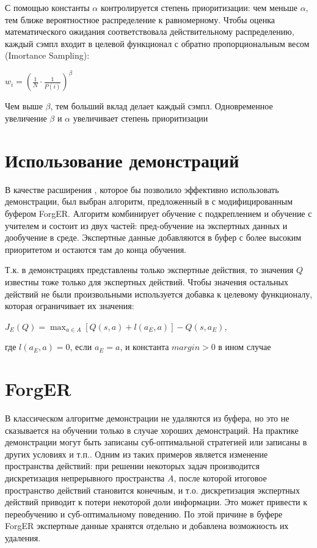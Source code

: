 \documentclass{mipt-thesis-bs}
\begin{document}
С помощью константы $\alpha$ контролируется степень приоритизации: чем меньше $\alpha$, тем ближе вероятностное распределение к равномерному. Чтобы оценка математического ожидания соответствовала действительному распределению, каждый сэмпл входит в целевой функционал с обратно пропорциональным весом (Imortance Sampling):

\begin{center}
$w_{i}=\left(\frac{1}{N} \cdot \frac{1}{P(i)}\right)^{\beta}$    
\end{center}

Чем выше $\beta$, тем больший вклад делает каждый сэмпл. Одновременное увеличение $\beta$ и $\alpha$ увеличивает степень приоритизации

\section{Использование демонстраций}

В качестве расширения \cite{dqn}, которое бы позволило эффективно использовать демонстрации, был выбран алгоритм, предложенный в \cite{dqfd} с модифицированным буфером ForgER. Алгоритм комбинирует обучение с подкреплением и обучение с учителем и состоит из двух частей: пред-обучение на экспертных данных и дообучение в среде. Экспертные данные добавляются в буфер с более высоким приоритетом и остаются там до конца обучения. 

Т.к. в демонстрациях представлены только экспертные действия, то значения $Q$ известны тоже только для экспертных действий. Чтобы значения остальных действий не были произвольными используется добавка к целевому функционалу, которая ограничивает их значения:

\begin{center}
    $J_{E}(Q)=\max _{a \in A}[Q(s, a)+l(a_{E}, a)]-Q(s, a_{E})$,
    
    где $l(a_{E}, a) = 0$, если $a_{E} = a$, и константа $margin>0$ в ином случае
\end{center}
 
 
\section{ForgER}

В классическом алгоритме демонстрации не удаляются из буфера, но это не сказывается на обучении только в случае хороших демонстраций. На практике демонстрации могут быть записаны суб-оптимальной стратегией или записаны в других условиях и т.п.. Одним из таких примеров является изменение пространства действий: при решении некоторых задач производится дискретизация непрерывного пространства $A$, после которой итоговое пространство действий становится конечным, и т.о. дискретизация экспертных действий приводит к потери некоторой доли информации.  Это может привести к переобучению и суб-оптимальному поведению. По этой причине в буфере ForgER экспертные данные хранятся отдельно и добавлена возможность их удаления.
\end{document}
